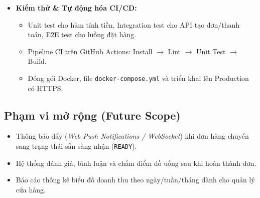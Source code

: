 \documentclass[12pt,a4paper]{article}
\begin{document}
\begin{itemize}[leftmargin=*,itemsep=2pt]
    \begin{itemize}
        \item Theo dõi trạng thái đơn hàng thời gian thực theo máy trạng thái: \texttt{PENDING} $\rightarrow$ \texttt{PAID} $\rightarrow$ \texttt{PREPARING} $\rightarrow$ \texttt{READY} $\rightarrow$ \texttt{COMPLETED}.
        \item Xem danh sách lịch sử các đơn hàng đã đặt và chi tiết từng hóa đơn.
        \item Tự động tích lũy điểm thưởng thành viên: $10.000\text{ VNĐ} = 1\text{ điểm}$ vào tài khoản.
    \end{itemize}
    \item \textbf{Kiểm thử \& Tự động hóa CI/CD:}
    \begin{itemize}
        \item Unit test cho hàm tính tiền, Integration test cho API tạo đơn/thanh toán, E2E test cho luồng đặt hàng.
        \item Pipeline CI trên GitHub Actions: Install $\rightarrow$ Lint $\rightarrow$ Unit Test $\rightarrow$ Build.
        \item Đóng gói Docker, file \texttt{docker-compose.yml} và triển khai lên Production có HTTPS.
    \end{itemize}
\end{itemize}

\subsection{Phạm vi mở rộng (Future Scope)}
\begin{itemize}[leftmargin=*,itemsep=1pt]
    \item Thông báo đẩy (\textit{Web Push Notifications / WebSocket}) khi đơn hàng chuyển sang trạng thái sẵn sàng nhận (\texttt{READY}).
    \item Hệ thống đánh giá, bình luận và chấm điểm đồ uống sau khi hoàn thành đơn.
    \item Báo cáo thống kê biểu đồ doanh thu theo ngày/tuần/tháng dành cho quản lý cửa hàng.
\end{itemize}
\end{document}
